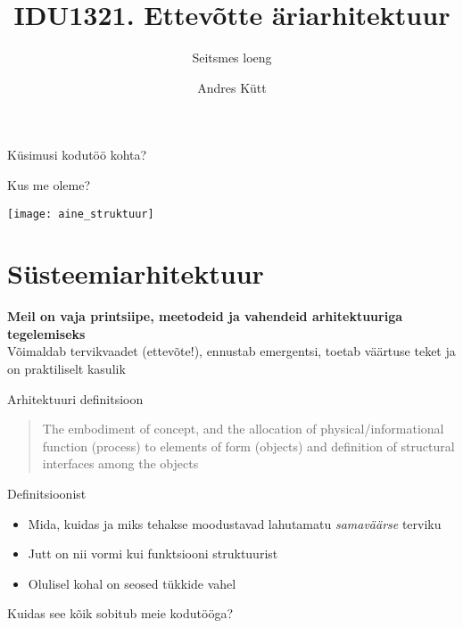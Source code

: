 \documentclass{beamer}
\title{IDU1321. Ettevõtte äriarhitektuur}
\subtitle{Seitsmes loeng}
\author{Andres Kütt}
\institute{Arhitekt}
\begin{document}
\begin{frame}
\titlepage
\end{frame}


\begin{frame}[standout]
Küsimusi kodutöö kohta?
\end{frame}


\begin{frame}{Kus me oleme?}
	\begin{center}
		\texttt{[image: aine\_struktuur]}
	\end{center}
\end{frame}

\section{Süsteemiarhitektuur}
\begin{frame}[fragile]
	\begin{center}
		\LARGE{\textbf{Meil on vaja printsiipe, meetodeid ja vahendeid arhitektuuriga tegelemiseks}}
		\\[4cm]
		\small{Võimaldab tervikvaadet (ettevõte!), ennustab emergentsi, toetab väärtuse teket ja on praktiliselt kasulik}
	\end{center}
\end{frame}

\begin{frame}{Arhitektuuri definitsioon}
	\blockquote{The embodiment of concept, and the allocation of physical/informational function (process) to elements of form (objects) and definition of structural interfaces among the objects}

\cite{sysengineering}

\end{frame}

\begin{frame}{Definitsioonist}
	\begin{itemize}
		\item Mida, kuidas  ja miks tehakse moodustavad lahutamatu \emph{samaväärse} terviku
		\item Jutt on nii vormi kui funktsiooni struktuurist
		\item Olulisel kohal on seosed tükkide vahel
	\end{itemize}
	\begin{center}
		Kuidas see kõik sobitub meie kodutööga?
	\end{center}
\end{frame}
\end{document}
